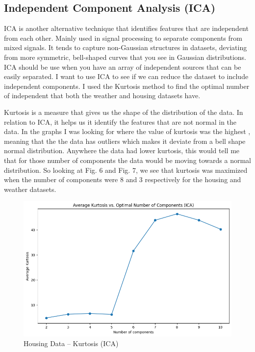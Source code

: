 \documentclass[conference]{IEEEtran}
\begin{document}
\subsection{Independent Component Analysis (ICA)}
\par ICA is another alternative technique that identifies features that are independent from each other. Mainly used in signal processing to separate components from mixed signals. It tends to capture non-Gaussian structures in datasets, deviating from more symmetric, bell-shaped curves that you see in Gaussian distributions. ICA should be use when you have an array of independent sources that can be easily separated. I want to use ICA to see if we can reduce the dataset to include independent components. I used the Kurtosis method to find the optimal number of independent that both the weather and housing datasets have. 
\par Kurtosis is a measure that gives us the shape of the distribution of the data. In relation to ICA, it helps us it identify the features that are not normal in the data. In the graphs I was looking for where the value of kurtosis was the highest , meaning that the the data has outliers which makes it deviate from a bell shape normal distribution. Anywhere the data had lower kurtosis, this would tell me that for those number of components the data would be moving towards a normal distribution. So looking at Fig. 6 and Fig. 7, we see that kurtosis was maximized when the number of components were 8 and 3 respectively for the housing and weather datasets. 
\begin{figure}
    \centering
    \includegraphics[width=0.9\linewidth]{figures//housing_figures/step_2b.png}
    \caption{Housing Data -- Kurtosis (ICA)}
    \label{fig:6_housing_kurtosis
}
\end{figure}
\end{document}
